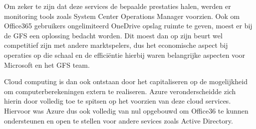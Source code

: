 Om zeker te zijn dat deze services de bepaalde prestaties halen, werden er monitoring tools zoals System Center Operations Manager voorzien. Ook om Office365 gebruikers ongelimiteerd OneDrive opslag ruimte te geven, moest er bij de GFS een oplossing bedacht worden. Dit moest dan op zijn beurt wel competitief zijn met andere marktspelers, dus het economische aspect bij operaties op die schaal en de efficiëntie hierbij waren belangrijke aspecten voor Microsoft en het GFS team.

Cloud computing is dan ook ontstaan door het capitaliseren op de mogelijkheid om computerberekeningen extern te realiseren. Azure veronderscheidde zich hierin door volledig toe te spitsen op het voorzien van deze cloud services. Hiervoor was Azure dus ook volledig van nul opgebouwd om Office36 te kunnen ondersteunen en open te stellen voor andere sevices zoals Active Directory.\autocite{Copeland2015}

\subsection{}%
\label{sec:}
\subsection{}%
\label{sec:}
\subsection{}%
\label{sec:}
\subsection{}%
\label{sec:}